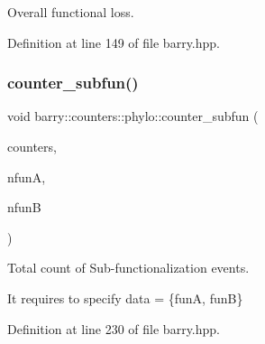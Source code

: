 Overall functional loss. 



Definition at line 149 of file barry.\+hpp.

\mbox{\label{namespacebarry_1_1counters_1_1phylo_a1bc5928ddc9cd008f04de022ad9d784e}} 
\subsubsection{\texorpdfstring{counter\+\_\+subfun()}{counter\_subfun()}}
{\footnotesize\ttfamily void barry\+::counters\+::phylo\+::counter\+\_\+subfun (\begin{DoxyParamCaption}\item[{\hyperlink{namespacebarry_1_1counters_1_1phylo_a4e401ffe66d04091343dcffaf915f8c3}{Phylo\+Counters} $\ast$}]{counters,  }\item[{\hyperlink{namespacebarry_a11dfc53ddb4672278319aa04f1e09a6c}{uint}}]{nfunA,  }\item[{\hyperlink{namespacebarry_a11dfc53ddb4672278319aa04f1e09a6c}{uint}}]{nfunB }\end{DoxyParamCaption})\hspace{0.3cm}{\ttfamily [inline]}}



Total count of Sub-\/functionalization events. 

It requires to specify data = \{funA, funB\} 

Definition at line 230 of file barry.\+hpp.

